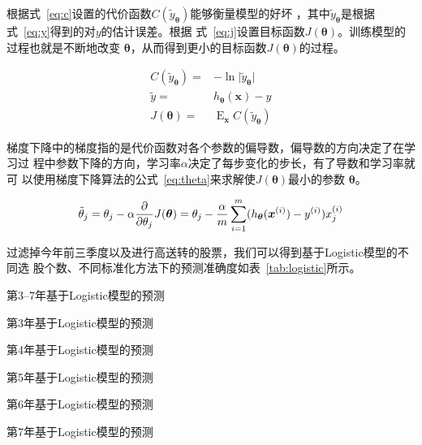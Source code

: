 \documentclass[../main]{subfiles}
\begin{document}
根据式~\ref{eq:c}设置的代价函数$C(\tilde{y}_{\bm{\theta}})$能够衡量模型的好坏
，其中$\tilde{y}_{\bm{\theta}}$是根据式~\ref{eq:y}得到的对$y$的估计误差。根据
式~\ref{eq:j}设置目标函数$J(\bm{\theta})$。训练模型的过程也就是不断地改变
$\bm{\theta}$，从而得到更小的目标函数$J(\bm{\theta})$的过程。

\begin{align}
  \label{eq:c}
  C(\tilde{y}_{\bm{\theta}}) = & -\ln\lvert \tilde{y}_{\bm{\theta}}\rvert\\
  \label{eq:y}
  \tilde{y} = & h_{\bm{\theta}}(\bm{x}) - y\\
  \label{eq:j}
  J(\bm{\theta}) = & \mathop{\mathrm{E}}_{\bm{x}}C(\tilde{y}_{\bm{\theta}})
\end{align}

梯度下降中的梯度指的是代价函数对各个参数的偏导数，偏导数的方向决定了在学习过
程中参数下降的方向，学习率$\alpha$决定了每步变化的步长，有了导数和学习率就可
以使用梯度下降算法的公式~\ref{eq:theta}来求解使$J(\bm{\theta})$最小的参数
$\bm{\theta}$。

\begin{align}
  \label{eq:theta}
  \tilde{\theta}_j = \theta_j -
  \alpha\pdv{\theta_j}J(\bm{\theta}) = \theta_j -
  \frac{\alpha}{m}\sum^{m}_{i = 1}(h_{\bm{\theta}}(\bm{x}^{(i)}) -
  y^{(i)})x_j^{(i)}
\end{align}

过滤掉今年前三季度以及进行高送转的股票，我们可以得到基于Logistic模型的不同选
股个数、不同标准化方法下的预测准确度如表~\ref{tab:logistic}所示。

\begin{table}[htpb]
  \centering
  \caption{第3--7年基于Logistic模型的预测}%
  \label{tab:logistic}
  \setlength\tabcolsep{2pt}
  \begin{subtable}[htbp]{0.45\linewidth}
    \centering
    \caption{第3年基于Logistic模型的预测}%
    \label{tab:logistic3}
  \end{subtable}
  \qquad
  \begin{subtable}[htbp]{0.45\linewidth}
    \centering
    \caption{第4年基于Logistic模型的预测}%
    \label{tab:logistic4}
  \end{subtable}

  \begin{subtable}[htbp]{0.45\linewidth}
    \centering
    \caption{第5年基于Logistic模型的预测}%
    \label{tab:logistic5}
  \end{subtable}
  \qquad
  \begin{subtable}[htbp]{0.45\linewidth}
    \centering
    \caption{第6年基于Logistic模型的预测}%
    \label{tab:logistic6}
  \end{subtable}

  \begin{subtable}[htbp]{0.45\linewidth}
    \centering
    \caption{第7年基于Logistic模型的预测}%
    \label{tab:logistic7}
  \end{subtable}
\end{table}
\end{document}
